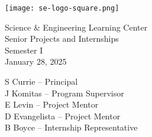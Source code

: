 \vspace*{\fill}
\begin{center}
\texttt{[image: se-logo-square.png]}
\end{center}
\vspace{1em}
\begin{center}
\large{Science \& Engineering Learning Center}\\
Senior Projects and Internships\\
Semester I\\
January 28, 2025
\end{center}
\vfill
\begin{center}
\large{
S Currie -- Principal\\
J Komitas -- Program Supervisor\\
E Levin -- Project Mentor\\
D Evangelista -- Project Mentor\\
B Boyce -- Internship Representative}
\end{center}
\vspace*{\fill}
